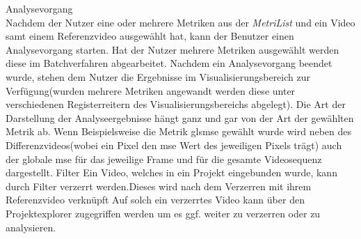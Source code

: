 % 
 Analysevorgang \\
Nachdem der Nutzer eine oder mehrere Metriken aus der \emph{MetriList} und ein
Video samt einem Referenzvideo ausgewählt hat, kann der Benutzer einen Analysevorgang starten. Hat der
Nutzer mehrere Metriken ausgewählt werden diese im Batchverfahren abgearbeitet. Nachdem ein Analysevorgang
beendet wurde, stehen dem Nutzer die Ergebnisse im Visualisierungsbereich zur Verfügung(wurden 
mehrere Metriken angewandt werden diese unter verschiedenen Registerreitern des Visualisierungsbereichs
abgelegt). Die Art der Darstellung der Analyseergebnisse hängt ganz und gar von der Art der gewählten 
Metrik ab. Wenn Beispielsweise die Metrik gls{mse} gewählt wurde wird neben des Differenzvideos(wobei ein
Pixel den \gls{mse} Wert des jeweiligen Pixels trägt) auch der globale \gls{mse} für das jeweilige Frame
und für die gesamte Videosequenz dargestellt.
 Filter
\newline
Ein Video, welches in ein Projekt eingebunden wurde, kann durch Filter verzerrt werden.Dieses wird
nach dem Verzerren mit ihrem Referenzvideo verknüpft  Auf solch ein verzerrtes Video kann über den Projektexplorer zugegriffen werden um es ggf. weiter zu verzerren oder zu analysieren.


